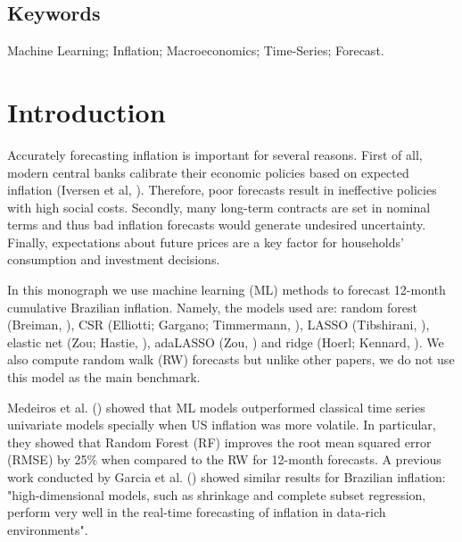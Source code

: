 \documentclass[12pt,openright,twoside,a4paper,brazil,english,emptypage,openany]{abntex2}
\makeatletter
\renewcommand{\tableofcontents}{%
  \chapter*{\MakeUppercase\contentsname}
  \@starttoc{toc}
}
\makeatother
\begin{document}
\vspace{4\onelineskip}
\noindent
\section*{Keywords}
\hspace{1em}Machine Learning; Inflation; Macroeconomics; Time-Series; Forecast.

\tableofcontents

\lhead{\thepage}

\chapter{Introduction}

\hspace{1em} Accurately forecasting inflation is important for several reasons. First of all, modern central banks calibrate their economic policies based on expected inflation (Iversen et al, \citeyear{iversen}). Therefore, poor forecasts result in ineffective policies with high social costs. Secondly, many long-term contracts are set in nominal terms and thus bad inflation forecasts would generate undesired uncertainty. Finally, expectations about future prices are a key factor for households' consumption and investment decisions. 

In this monograph we use machine learning (ML) methods to forecast 12-month cumulative Brazilian inflation. Namely, the models used are: random forest (Breiman, \citeyear{breiman2001random}), CSR  (Elliotti; Gargano; Timmermann, \citeyear{elliott2013complete}), LASSO (Tibshirani, \citeyear{tibshirani1996regression}), elastic net (Zou; Hastie, \citeyear{elnet}), adaLASSO (Zou, \citeyear{adalasso}) and ridge (Hoerl;
Kennard, \citeyear{ridge}). We also compute random walk (RW) forecasts but unlike other papers, we do not use this model as the main benchmark.

Medeiros et al$.$ (\citeyear{datarich}) showed that ML models outperformed classical time series univariate models specially when US inflation was more volatile. In particular, they showed that Random Forest (RF) improves the root mean squared error (RMSE) by 25\% when compared to the RW for 12-month forecasts. A previous work conducted by Garcia et al$.$ (\citeyear{RealTime}) showed similar results for Brazilian inflation: "high-dimensional models, such as shrinkage and complete subset regression, perform very well in the real-time forecasting of inflation in data-rich environments".
\end{document}
